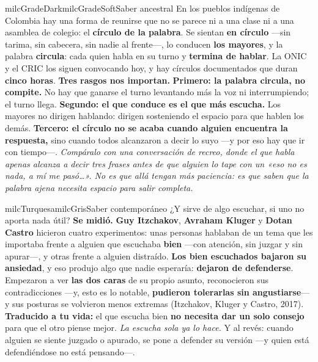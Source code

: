 \documentclass[11pt,letterpaper]{article}
\begin{document}
\begin{softbox}{milcGradeDark}{milcGradeSoft}{Saber ancestral}
En los pueblos indígenas de Colombia hay una forma de reunirse que no se parece ni a una clase ni a una asamblea de colegio: el \textbf{círculo de la palabra}. Se sientan \textbf{en círculo} ---sin tarima, sin cabecera, sin nadie al frente---, lo conducen \textbf{los mayores}, y la palabra \textbf{circula}: cada quien habla en su turno y \textbf{termina de hablar}. La ONIC y el CRIC los siguen convocando hoy, y hay círculos documentados que duran \textbf{cinco horas}. \textbf{Tres rasgos nos importan.} \textbf{Primero: la palabra circula, no compite.} No hay que ganarse el turno levantando más la voz ni interrumpiendo; el turno llega. \textbf{Segundo: el que conduce es el que más escucha.} Los mayores no dirigen hablando: dirigen sosteniendo el espacio para que hablen los demás. \textbf{Tercero: el círculo no se acaba cuando alguien encuentra la respuesta,} sino cuando todos alcanzaron a decir lo suyo ---y por eso hay que ir con tiempo---. \emph{Compáralo con una conversación de recreo, donde el que habla apenas alcanza a decir tres frases antes de que alguien lo tape con un «eso no es nada, a mí me pasó\ldots». No es que allá tengan más paciencia: es que saben que la palabra ajena necesita espacio para salir completa.}
\end{softbox}

\begin{softbox}{milcTurquesa}{milcGris}{Saber contemporáneo}
¿Y sirve de algo escuchar, si uno no aporta nada útil? \textbf{Se midió.} \textbf{Guy Itzchakov}, \textbf{Avraham Kluger} y \textbf{Dotan Castro} hicieron cuatro experimentos: unas personas hablaban de un tema que les importaba frente a alguien que escuchaba \textbf{bien} ---con atención, sin juzgar y sin apurar---, y otras frente a alguien distraído. \textbf{Los bien escuchados bajaron su ansiedad}, y eso produjo algo que nadie esperaría: \textbf{dejaron de defenderse}. Empezaron a ver \textbf{las dos caras} de su propio asunto, reconocieron sus contradicciones ---y, esto es lo notable, \textbf{pudieron tolerarlas sin angustiarse}--- y sus posturas se volvieron menos extremas (Itzchakov, Kluger y Castro, 2017). \textbf{Traducido a tu vida:} el que escucha bien \textbf{no necesita dar un solo consejo} para que el otro piense mejor. \emph{La escucha sola ya lo hace.} Y al revés: cuando alguien se siente juzgado o apurado, se pone a defender su versión ---y quien está defendiéndose no está pensando---.
\end{softbox}
\end{document}
